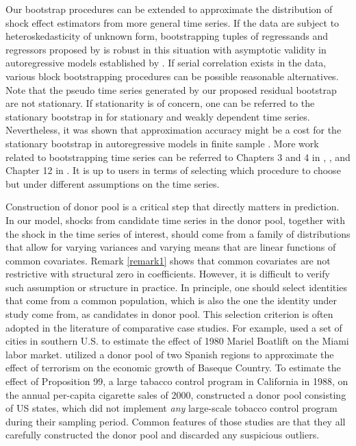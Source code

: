 \documentclass[11pt,3p,review,authoryear]{elsarticle}
\theoremstyle{definition}
\begin{document}
Our bootstrap procedures can be extended to approximate the distribution of shock effect estimators from more general time series. If the data are subject to heteroskedasticity of unknown form, bootstrapping tuples of regressands and regressors proposed by \citet{freedman1981bootstrapping} is robust in this situation with asymptotic validity in autoregressive models established by \citet{gonccalves2004bootstrapping}. If serial correlation exists in the data, various block bootstrapping procedures \citep{kunsch1989jackknife, liu1992moving} can be possible reasonable alternatives. Note that the pseudo time series generated by our proposed residual bootstrap are not stationary. If stationarity is of concern, one can be referred to the stationary bootstrap in \citet{politis1994stationary} for stationary and weakly dependent time series. Nevertheless, it was shown that approximation accuracy might be a cost for the stationary bootstrap in autoregressive  models in finite sample \citep{berkowitz1999finite}.  More work related to bootstrapping time series  can be referred to Chapters 3 and 4 in \citet{politis1999subsampling}, \citet{berkowitz2000recent}, and Chapter 12 in \citet{kilian2017structural}. It is up to  users in terms of selecting which procedure to choose but under different assumptions on the time series.


Construction of donor pool is a critical step that directly matters in prediction. In our model, shocks from candidate time series in the donor pool, together with the shock in the time series of interest, should come from a family of distributions that allow for  varying variances and  varying means that are linear functions of common covariates. Remark \ref{remark1} shows that common covariates are not restrictive with structural zero in coefficients. However, it is difficult to verify such assumption or structure in practice. In principle, one should select identities that come from a common population, which is also the one  the identity under study come from, as candidates in donor pool. This selection criterion is often adopted in the literature of comparative case studies. For example, \citet{card1990impact} used a set of cities in southern U.S. to estimate the effect of 1980 Mariel Boatlift on the Miami labor market. \citet{abadie2003economic} utilized a donor pool of two Spanish regions to approximate the effect of terrorism on  the economic growth of Baseque Country. To estimate the effect of Proposition 99, a large tabacco control program in California  in 1988, on the annual per-capita cigarette sales of 2000, \cite{abadie2010synthetic} constructed a donor pool consisting of US states, which did not implement \emph{any} large-scale tobacco control program during their sampling period. Common features of those studies are that they all carefully constructed the donor pool and discarded any suspicious outliers. 
\end{document}
